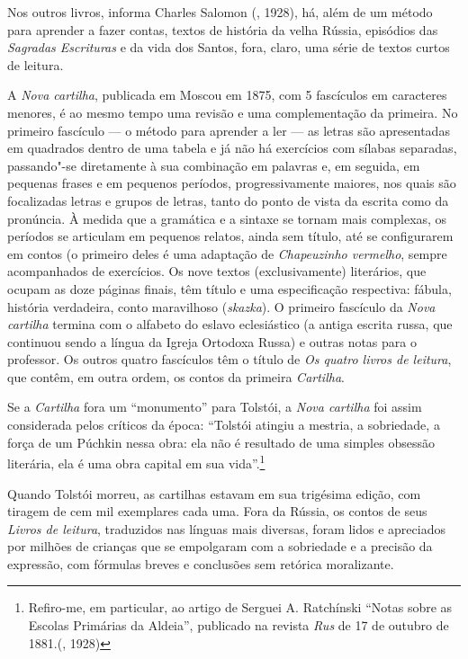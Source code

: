 Nos outros livros, informa Charles Salomon (,
1928), há, além de um método para aprender a fazer contas, textos
de história da velha Rússia, episódios das \emph{Sagradas
Escrituras} e da vida dos Santos, fora, claro, uma série de
textos curtos de leitura.

A \emph{Nova cartilha}, publicada em Moscou em 1875, com 5
fascículos em caracteres menores, é ao mesmo tempo uma revisão
e uma complementação da primeira. No primeiro fascículo --- o
método para aprender a ler --- as letras são apresentadas em
quadrados dentro de uma tabela e já não há exercícios com
sílabas separadas, passando"-se diretamente à sua combinação
em palavras e, em seguida, em pequenas frases e em pequenos
períodos, progressivamente maiores, nos quais são focalizadas
letras e grupos de letras, tanto do ponto de vista da escrita
como da pronúncia. À medida que a gramática e a sintaxe se
tornam mais complexas, os períodos se articulam em pequenos
relatos, ainda sem título, até se configurarem em contos (o
primeiro deles é uma adaptação de \emph{Chapeuzinho vermelho},
sempre acompanhados de exercícios. Os nove textos (exclusivamente)
literários, que ocupam as doze páginas finais, têm título e uma
especificação respectiva: fábula, história verdadeira, conto
maravilhoso (\emph{skazka}). O primeiro fascículo da \emph{Nova
cartilha} termina com o alfabeto do eslavo eclesiástico (a antiga
escrita russa, que continuou sendo a língua da Igreja Ortodoxa
Russa) e outras notas para o professor. Os outros quatro
fascículos têm o título de \emph{Os quatro livros de leitura},
que contêm, em outra ordem, os contos da primeira \emph{Cartilha}.

Se a \emph{Cartilha} fora um ``monumento'' para Tolstói, a \emph{Nova
cartilha} foi assim considerada pelos críticos da época: ``Tolstói
atingiu a mestria, a sobriedade, a força de um Púchkin nessa obra:
ela não é resultado de uma simples obsessão literária, ela é uma
obra capital em sua vida''.\footnote{Refiro-me, em particular,
ao artigo de Serguei A. Ratchínski ``Notas sobre as Escolas
Primárias da Aldeia'', publicado na revista \emph{Rus} de 17
de outubro de 1881.(, 1928)}

Quando Tolstói morreu, as cartilhas estavam em sua trigésima
edição, com tiragem de cem mil exemplares cada uma. Fora da
Rússia, os contos de seus \emph{Livros de leitura}, traduzidos
nas línguas mais diversas, foram lidos e apreciados por milhões
de crianças que se empolgaram com a sobriedade e a precisão da
expressão, com fórmulas breves e conclusões sem retórica
moralizante.

